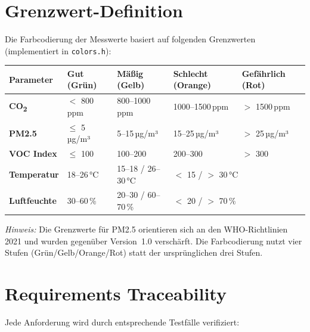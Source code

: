 \documentclass[a4paper,11pt]{article}
\begin{document}
\section{Grenzwert-Definition}

Die Farbcodierung der Messwerte basiert auf folgenden Grenzwerten (implementiert in \texttt{colors.h}):

\begin{longtable}{p{2.5cm} p{2.5cm} p{2.5cm} p{2.5cm} p{2.5cm}}
\toprule
\rowcolor{tableheader}
\textbf{Parameter} & \textbf{Gut (Grün)} & \textbf{Mäßig (Gelb)} & \textbf{Schlecht (Orange)} & \textbf{Gefährlich (Rot)} \\
\midrule
\endhead

\textbf{CO\textsubscript{2}} & $<$ 800\,ppm & 800--1000\,ppm & 1000--1500\,ppm & $>$ 1500\,ppm \\
\midrule
\textbf{PM2.5} & $\leq$ 5\,µg/m³ & 5--15\,µg/m³ & 15--25\,µg/m³ & $>$ 25\,µg/m³ \\
\midrule
\textbf{VOC Index} & $\leq$ 100 & 100--200 & 200--300 & $>$ 300 \\
\midrule
\textbf{Temperatur} & 18--26\,°C & 15--18 / 26--30\,°C & \multicolumn{2}{l}{$<$ 15 / $>$ 30\,°C} \\
\midrule
\textbf{Luftfeuchte} & 30--60\,\% & 20--30 / 60--70\,\% & \multicolumn{2}{l}{$<$ 20 / $>$ 70\,\%} \\

\bottomrule
\end{longtable}

\textit{Hinweis:} Die Grenzwerte für PM2.5 orientieren sich an den WHO-Richtlinien 2021 und wurden gegenüber Version~1.0 verschärft. Die Farbcodierung nutzt vier Stufen (Grün/Gelb/Orange/Rot) statt der ursprünglichen drei Stufen.

\section{Requirements Traceability}

Jede Anforderung wird durch entsprechende Testfälle verifiziert:
\end{document}
